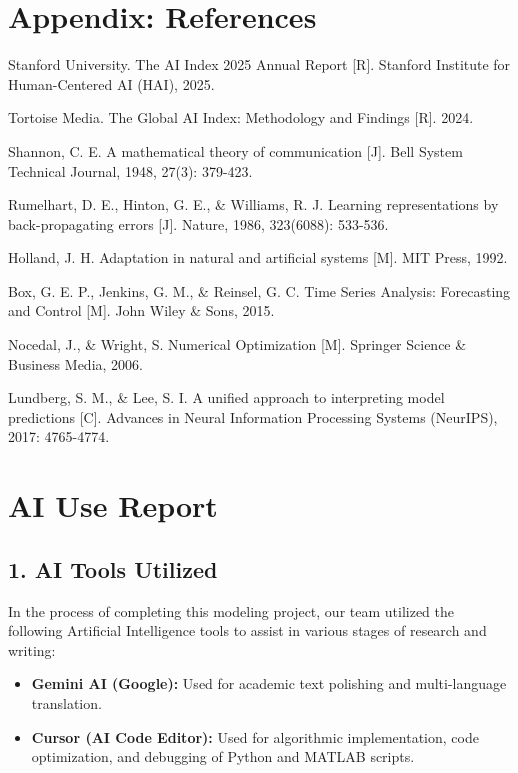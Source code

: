 \documentclass[12pt]{article}
\begin{document}
	\newpage
	\section*{Appendix: References}
	\begin{enumerate}[label={[\arabic*]}]
		\item Stanford University. The AI Index 2025 Annual Report [R]. Stanford Institute for Human-Centered AI (HAI), 2025.
		\item Tortoise Media. The Global AI Index: Methodology and Findings [R]. 2024.
		\item Shannon, C. E. A mathematical theory of communication [J]. Bell System Technical Journal, 1948, 27(3): 379-423.
		\item Rumelhart, D. E., Hinton, G. E., \& Williams, R. J. Learning representations by back-propagating errors [J]. Nature, 1986, 323(6088): 533-536.
		\item Holland, J. H. Adaptation in natural and artificial systems [M]. MIT Press, 1992.
		\item Box, G. E. P., Jenkins, G. M., \& Reinsel, G. C. Time Series Analysis: Forecasting and Control [M]. John Wiley \& Sons, 2015.
		\item Nocedal, J., \& Wright, S. Numerical Optimization [M]. Springer Science \& Business Media, 2006.
		\item Lundberg, S. M., \& Lee, S. I. A unified approach to interpreting model predictions [C]. Advances in Neural Information Processing Systems (NeurIPS), 2017: 4765-4774.
	\end{enumerate}
	
	\newpage
	\section*{AI Use Report}
	\subsection*{1. AI Tools Utilized}
	In the process of completing this modeling project, our team utilized the following Artificial Intelligence tools to assist in various stages of research and writing:
	\begin{itemize}
		\item \textbf{Gemini AI (Google):} Used for academic text polishing and multi-language translation.
		\item \textbf{Cursor (AI Code Editor):} Used for algorithmic implementation, code optimization, and debugging of Python and MATLAB scripts.
	\end{itemize}
	
\end{document}
